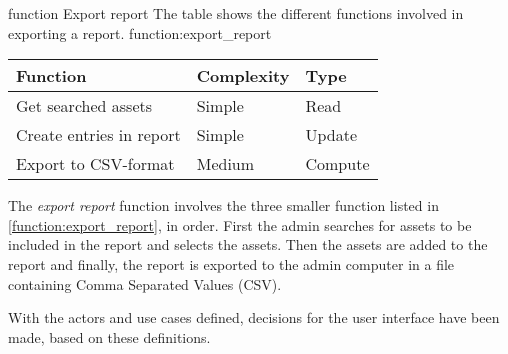 \fancyLayout
    {function}
    {Export report}
    {The table shows the different functions involved in exporting a report.}
    {function:export_report}
    {
        \centering
        \begin{tabular}{|l|l|l|}
            \hline
            \textbf{Function} & \textbf{Complexity} & \textbf{Type}\\
            \hline
            \hline
            Get searched assets & Simple & Read \\
            \hline
            Create entries in report & Simple & Update \\
            \hline
            Export to CSV-format & Medium & Compute \\
            \hline
        \end{tabular}
}

The \textit{export report} function involves the three smaller function listed in \autoref{function:export_report}, in order. First the admin searches for assets to be included in the report and selects the assets. Then the assets are added to the report and finally, the report is exported to the admin computer in a file containing Comma Separated Values (CSV).
\par
With the actors and use cases defined, decisions for the user interface have been made, based on these definitions.
